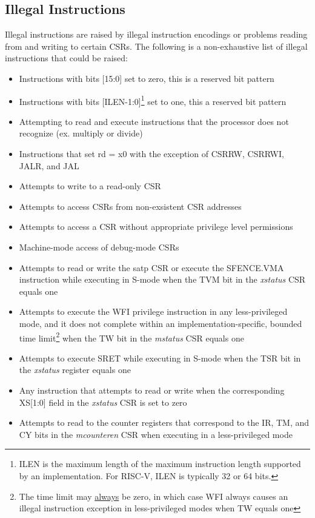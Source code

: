 \documentclass[12pt]{article}
\begin{document}
\subsection{Illegal Instructions}
Illegal instructions are raised by illegal instruction encodings or problems reading from and writing to certain CSRs. The following is a non-exhaustive list of illegal instructions that could be raised:
\begin{itemize}
    \item Instructions with bits [15:0] set to zero, this is a reserved bit pattern
    \item Instructions with bits [ILEN-1:0]\footnote[1]{ILEN is the maximum length of the maximum instruction length supported by an implementation. For RISC-V, ILEN is typically 32 or 64 bits.} set to one, this a reserved bit pattern 
    \item Attempting to read and execute instructions that the processor does not recognize (ex. multiply or divide)
    \item Instructions that set rd = x0 with the exception of CSRRW, CSRRWI, JALR, and JAL
    \item Attempts to write to a read-only CSR 
    \item Attempts to access CSRs from non-exsistent CSR addresses
    \item Attempts to access a CSR without appropriate privilege level permissions 
    \item Machine-mode access of debug-mode CSRs
    \item Attempts to read or write the satp CSR or execute the SFENCE.VMA instruction while executing in S-mode when the TVM bit in the \emph{xstatus} CSR equals one
    \item Attempts to execute the WFI privilege instruction in any less-privileged mode, and it does not complete within an implementation-specific, bounded time limit\footnote[2]{The time limit may \underline{always} be zero, in which case WFI always causes an illegal instruction exception in less-privileged modes when TW equals one} when the TW bit in the \emph{mstatus} CSR equals one
    \item Attempts to execute SRET while executing in S-mode when the TSR bit in the \emph{xstatus} register equals one
    \item Any instruction that attempts to read or write when the corresponding XS[1:0] field in the \emph{xstatus} CSR is set to zero
    \item Attempts to read to the counter registers that correspond to the IR, TM, and CY bits in the \emph{mcounteren} CSR when executing in a less-privileged mode 
\end{itemize}
\end{document}
